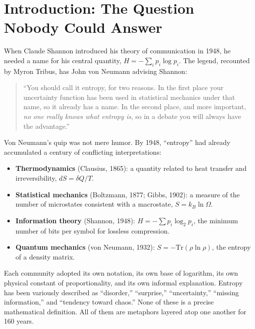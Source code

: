 \documentclass[12pt,a4paper]{article}
\theoremstyle{definition}
\begin{document}
\tableofcontents
\newpage

\section{Introduction: The Question Nobody Could Answer}
\label{sec:intro}

When Claude Shannon introduced his theory of communication in 1948, he
needed a name for his central quantity,
$H = -\sum_{i} p_i \log p_i$.
The legend, recounted by Myron Tribus, has John von Neumann advising
Shannon:

\begin{quote}
``You should call it entropy, for two reasons.  In the first place your
uncertainty function has been used in statistical mechanics under that
name, so it already has a name.  In the second place, and more
important, \emph{no one really knows what entropy is}, so in a debate
you will always have the advantage.''
\end{quote}

\noindent
Von Neumann's quip was not mere humor.  By 1948, ``entropy'' had
already accumulated a century of conflicting interpretations:

\begin{itemize}[nosep]
  \item \textbf{Thermodynamics} (Clausius, 1865): a quantity related to
    heat transfer and irreversibility, $dS = \delta Q / T$.
  \item \textbf{Statistical mechanics} (Boltzmann, 1877; Gibbs, 1902):
    a measure of the number of microstates consistent with a
    macrostate, $S = k_B \ln \Omega$.
  \item \textbf{Information theory} (Shannon, 1948):
    $H = -\sum p_i \log_2 p_i$, the minimum number of bits per symbol
    for lossless compression.
  \item \textbf{Quantum mechanics} (von Neumann, 1932):
    $S = -\mathrm{Tr}(\rho \ln \rho)$, the entropy of a density
    matrix.
\end{itemize}

Each community adopted its own notation, its own base of logarithm, its
own physical constant of proportionality, and its own informal
explanation.  Entropy has been variously described as ``disorder,''
``surprise,'' ``uncertainty,'' ``missing information,'' and ``tendency
toward chaos.''  None of these is a precise mathematical definition.
All of them are metaphors layered atop one another for 160 years.
\end{document}
